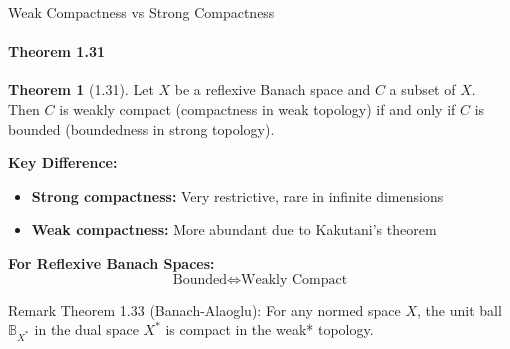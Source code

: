 \documentclass[aspectratio=169,10pt]{beamer}
\theoremstyle{definition}
\newtheorem{thm}{Theorem}
\begin{document}
\begin{frame}{Weak Compactness vs Strong Compactness}
\framesubtitle{Theorem 1.31}

\begin{thm}[1.31]
Let $X$ be a reflexive Banach space and $C$ a subset of $X$. Then $C$ is weakly compact (compactness in weak topology) if and only if $C$ is bounded (boundedness in strong topology).
\end{thm}

\vspace{0.4cm}

\textbf{Key Difference:}
\begin{itemize}
    \item \textbf{Strong compactness:} Very restrictive, rare in infinite dimensions
    \item \textbf{Weak compactness:} More abundant due to Kakutani's theorem
\end{itemize}

\vspace{0.3cm}

\textbf{For Reflexive Banach Spaces:}
\begin{equation*}
\text{Bounded} \iff \text{Weakly Compact}
\end{equation*}

\vspace{0.3cm}

\begin{block}{Remark}
Theorem 1.33 (Banach-Alaoglu): For any normed space $X$, the unit ball $\mathbb{B}_{X^*}$ in the dual space $X^*$ is compact in the weak* topology.
\end{block}
\end{frame}
\end{document}
